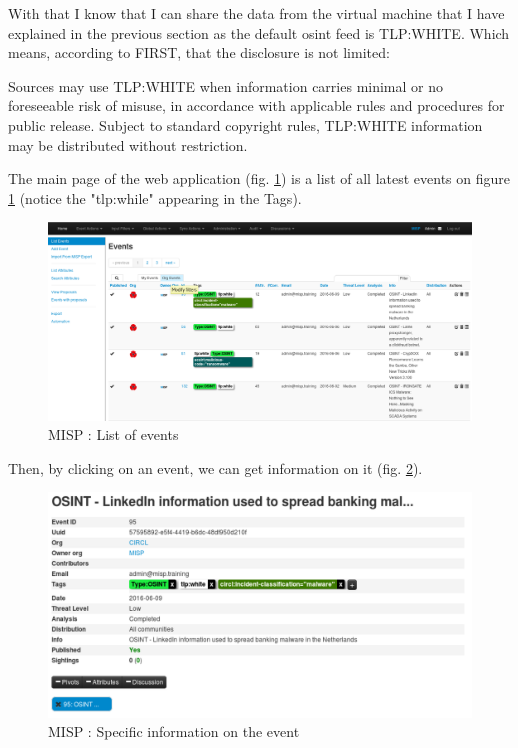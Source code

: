 \documentclass{eplmastersthesis}
\begin{document}
With that I know that I can share the data from the virtual machine that I have explained in the previous section as the default \gls{osint} feed is TLP:WHITE. Which means, according to FIRST, that the disclosure is not limited: \\

\begin{boxedverbatim}
	Sources may use TLP:WHITE when information carries minimal or no foreseeable 
	risk of misuse, in accordance with applicable rules and procedures for public 
	release. Subject to standard copyright rules, TLP:WHITE information may be 
	distributed without restriction.
\end{boxedverbatim}

The main page of the web application (fig. \ref{webevents}) is a list of all latest events on figure \ref{webevents} (notice the "tlp:while" appearing in the Tags).

\begin{figure}[!h]
	\begin{center}
		\includegraphics[scale=0.32]{res/webEvents}
		\caption{MISP : List of events}
		\label{webevents}
	\end{center}
\end{figure}


Then, by clicking on an event, we can get information on it (fig. \ref{webevent}).


\begin{figure}[!h]
	\begin{center}
		\includegraphics[scale=0.35]{res/webEvent}
		\caption{MISP : Specific information on the event}
		\label{webevent}
	\end{center}
\end{figure}
\end{document}
